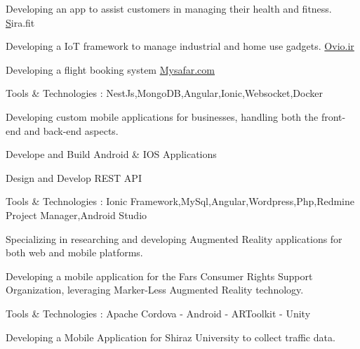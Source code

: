 \documentclass[]{plushcv}
\begin{document}
\begin{minipage}[t]{0.70\textwidth}
\vspace{\topsep} %
\begin{tightemize}
\sectionsep
\item Developing an app to assist customers in managing their health and fitness. \href{https://sira.fit} Sira.fit 
\item Developing a IoT framework to manage industrial and home use gadgets.  \href{https://www.ovio.ir}{Ovio.ir} 
\item Developing a flight booking system   \href{https://mysafar.com}{Mysafar.com} 
\item  Tools \& Technologies : NestJs,MongoDB,Angular,Ionic,Websocket,Docker
\end{tightemize}
\sectionsep


\begin{tightemize}
\sectionsep
\item Developing custom mobile applications for businesses, handling both the front-end and back-end aspects.
\item Develope and Build Android & IOS Applications
\item Design and Develop REST API
\item  Tools \& Technologies :
     Ionic Framework,MySql,Angular,Wordpress,Php,Redmine Project Manager,Android Studio
\end{tightemize}
\sectionsep

\begin{tightemize}
\sectionsep
\item Specializing in researching and developing Augmented Reality applications for both web and mobile platforms.
\item Developing a mobile application for the Fars Consumer Rights Support Organization, leveraging Marker-Less Augmented Reality technology.
\item  Tools \& Technologies : Apache Cordova - Android - ARToolkit - Unity
\end{tightemize}
\sectionsep


\begin{tightemize}
\sectionsep
\item Developing a Mobile Application for Shiraz University to collect traffic data.
\end{tightemize}
\sectionsep



\end{minipage}
\end{document}
